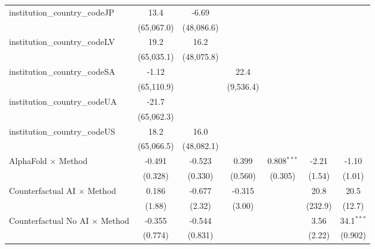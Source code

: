 \begin{tabular}{lcccccc}
   institution\_country\_codeJP          & 13.4         & -6.69        &              &               &            &   \\   
                                         & (65,067.0)   & (48,086.6)   &              &               &            &   \\   
   institution\_country\_codeLV          & 19.2         & 16.2         &              &               &            &   \\   
                                         & (65,035.1)   & (48,075.8)   &              &               &            &   \\   
   institution\_country\_codeSA          & -1.12        &              & 22.4         &               &            &   \\   
                                         & (65,110.9)   &              & (9,536.4)    &               &            &   \\   
   institution\_country\_codeUA          & -21.7        &              &              &               &            &   \\   
                                         & (65,062.3)   &              &              &               &            &   \\   
   institution\_country\_codeUS          & 18.2         & 16.0         &              &               &            &   \\   
                                         & (65,066.5)   & (48,082.1)   &              &               &            &   \\   
   AlphaFold $\times$ Method             & -0.491       & -0.523       & 0.399        & 0.808$^{***}$ & -2.21      & -1.10\\   
                                         & (0.328)      & (0.330)      & (0.560)      & (0.305)       & (1.54)     & (1.01)\\   
   Counterfactual AI $\times$ Method     & 0.186        & -0.677       & -0.315       &               & 20.8       & 20.5\\   
                                         & (1.88)       & (2.32)       & (3.00)       &               & (232.9)    & (12.7)\\   
   Counterfactual No AI $\times$ Method  & -0.355       & -0.544       &              &               & 3.56       & 34.1$^{***}$\\   
                                         & (0.774)      & (0.831)      &              &               & (2.22)     & (0.902)\\   

\end{tabular}
